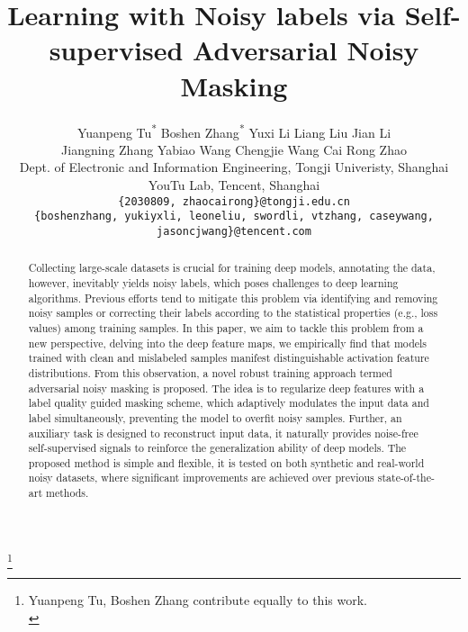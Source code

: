 \documentclass[10pt,twocolumn,letterpaper]{article}
\begin{document}
\title{Learning with Noisy labels via Self-supervised Adversarial Noisy Masking}

\author{Yuanpeng Tu\textsuperscript{*} \quad Boshen Zhang\textsuperscript{*} \quad Yuxi Li \quad Liang Liu \quad Jian Li \\ Jiangning Zhang \quad Yabiao Wang \quad  Chengjie Wang \quad Cai Rong Zhao\\
	Dept. of Electronic and Information Engineering, Tongji Univeristy, Shanghai \\ YouTu Lab, Tencent, Shanghai \\
{\tt\small \{2030809, zhaocairong\}@tongji.edu.cn}\\
	{\tt\small \{boshenzhang, yukiyxli, leoneliu, swordli, vtzhang, caseywang, jasoncjwang\}@tencent.com}}


\maketitle

\footnote{ Yuanpeng Tu, Boshen Zhang contribute equally to this work.\\}

\begin{abstract}
   Collecting large-scale datasets is crucial for training deep models, annotating the data,  however, inevitably yields noisy labels, which poses challenges to deep learning algorithms. Previous efforts tend to mitigate this problem via identifying and removing noisy samples or correcting their labels according to the statistical properties (e.g., loss values) among training samples. In this paper, we aim to tackle this problem from a new perspective, delving into the deep feature maps, we empirically find that models trained with clean and mislabeled samples manifest distinguishable activation feature distributions. From this observation, a novel robust training approach termed adversarial noisy masking is proposed. The idea is to regularize deep features with a label quality guided masking scheme, which adaptively modulates the input data and label simultaneously, preventing the model to overfit noisy samples. Further, an auxiliary task is designed to reconstruct input data, it naturally provides noise-free self-supervised signals to reinforce the generalization ability of deep models. The proposed method is simple and flexible, it is tested on both synthetic and real-world noisy datasets, where significant improvements are achieved over previous state-of-the-art methods. 
\end{abstract}
\end{document}
